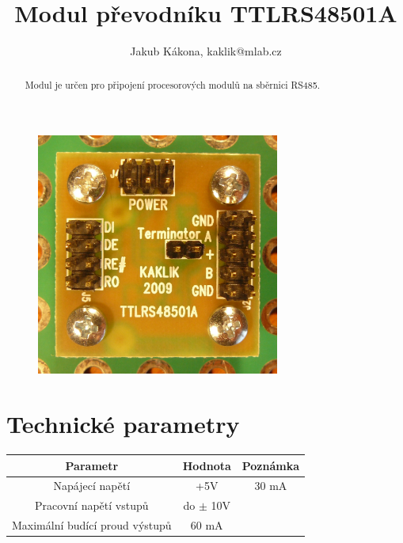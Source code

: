 \documentclass[12pt,a4paper,twoside]{article}
\begin{document}
\title{Modul převodníku TTLRS48501A}
\author{Jakub Kákona, kaklik@mlab.cz}
\maketitle

\thispagestyle{empty}
\begin{abstract}
Modul je určen pro připojení procesorových modulů na sběrnici RS485.
\end{abstract}

\begin{figure} [htbp]
\begin{center}
\includegraphics [width=80mm] {TTLRS48501A_Top_Big.JPG} 
\end{center}
\end{figure}

\tableofcontents


\section{Technické parametry}
\begin{table}[htbp]
\begin{center}
\begin{tabular}{|c|c|c|}
\hline
\multicolumn{1}{|c|}{Parametr} & \multicolumn{1}{|c|}{Hodnota} & \multicolumn{1}{|c|}{Poznámka} \\ \hline
Napájecí napětí & +5V &  30 mA \\ \hline
Pracovní napětí  vstupů & do $\pm$ 10V &  \\ \hline
Maximální budící proud výstupů & 60 mA & \\ \hline
\end{tabular}
\end{center}
\end{table}
\end{document}

